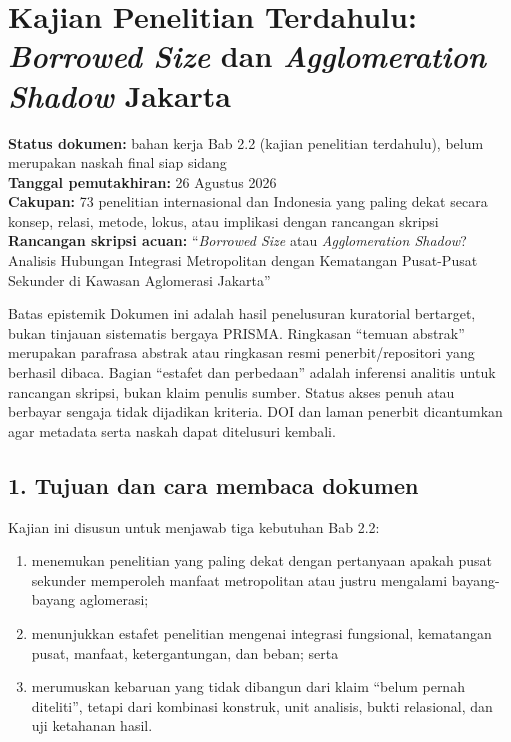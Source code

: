 \documentclass[
  indonesian,
  11pt,
  a4paper,
  oneside,
  openany]{report}
\providecommand{\tightlist}{%
  \setlength{\itemsep}{0pt}\setlength{\parskip}{0pt}}
\begin{document}
\chapter{\texorpdfstring{Kajian Penelitian Terdahulu: \emph{Borrowed
Size} dan \emph{Agglomeration Shadow}
Jakarta}{Kajian Penelitian Terdahulu: Borrowed Size dan Agglomeration Shadow Jakarta}}\label{kajian-penelitian-terdahulu-borrowed-size-dan-agglomeration-shadow-jakarta}

\textbf{Status dokumen:} bahan kerja Bab 2.2 (kajian penelitian
terdahulu), belum merupakan naskah final siap sidang\\
\textbf{Tanggal pemutakhiran:} 26 Agustus 2026\\
\textbf{Cakupan:} 73 penelitian internasional dan Indonesia yang paling
dekat secara konsep, relasi, metode, lokus, atau implikasi dengan
rancangan skripsi\\
\textbf{Rancangan skripsi acuan:} ``\emph{Borrowed Size} atau
\emph{Agglomeration Shadow}? Analisis Hubungan Integrasi Metropolitan
dengan Kematangan Pusat-Pusat Sekunder di Kawasan Aglomerasi Jakarta''

\begin{tcolorbox}

Batas epistemik Dokumen ini adalah hasil penelusuran kuratorial
bertarget, bukan tinjauan sistematis bergaya PRISMA. Ringkasan ``temuan
abstrak'' merupakan parafrasa abstrak atau ringkasan resmi
penerbit/repositori yang berhasil dibaca. Bagian ``estafet dan
perbedaan'' adalah inferensi analitis untuk rancangan skripsi, bukan
klaim penulis sumber. Status akses penuh atau berbayar sengaja tidak
dijadikan kriteria. DOI dan laman penerbit dicantumkan agar metadata
serta naskah dapat ditelusuri kembali.

\end{tcolorbox}

\section{1. Tujuan dan cara membaca
dokumen}\label{tujuan-dan-cara-membaca-dokumen}

Kajian ini disusun untuk menjawab tiga kebutuhan Bab 2.2:

\begin{enumerate}
\def\labelenumi{\arabic{enumi}.}
\tightlist
\item
  menemukan penelitian yang paling dekat dengan pertanyaan apakah pusat
  sekunder memperoleh manfaat metropolitan atau justru mengalami
  bayang-bayang aglomerasi;
\item
  menunjukkan estafet penelitian mengenai integrasi fungsional,
  kematangan pusat, manfaat, ketergantungan, dan beban; serta
\item
  merumuskan kebaruan yang tidak dibangun dari klaim ``belum pernah
  diteliti'', tetapi dari kombinasi konstruk, unit analisis, bukti
  relasional, dan uji ketahanan hasil.
\end{enumerate}
\end{document}
